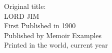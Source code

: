 \clearpage
\thispagestyle{empty}

\vspace*{\fill}

{\footnotesize \raggedright
Original title:\\
LORD JIM\\
First Published in 1900\\
Published by Memoir Examples\\
Printed in the world, current year\\
}